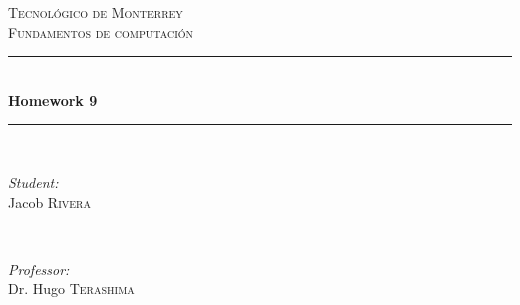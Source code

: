 \documentclass{article}
\begin{document}
\begin{titlepage}

    \newcommand{\HRule}{\rule{\linewidth}{0.5mm}} %

    \center %


    \textsc{\LARGE Tecnológico de Monterrey}\\[1.5cm] %
    \textsc{\Large Fundamentos de computación}\\[0.5cm] %


    \HRule \\[0.4cm]
    { \huge \bfseries Homework 9}\\[0.4cm] %
    \HRule \\[1.5cm]


    \begin{minipage}{0.4\textwidth}
    \begin{flushleft} \large
    \emph{Student:}\\
    Jacob \textsc{Rivera} %
    \end{flushleft}
    \end{minipage}
    ~
    \begin{minipage}{0.4\textwidth}
    \begin{flushright} \large
    \emph{Professor:} \\
    Dr. Hugo \textsc{Terashima} %
    \end{flushright}
    \end{minipage}\\[2cm]


\end{titlepage}
\end{document}
